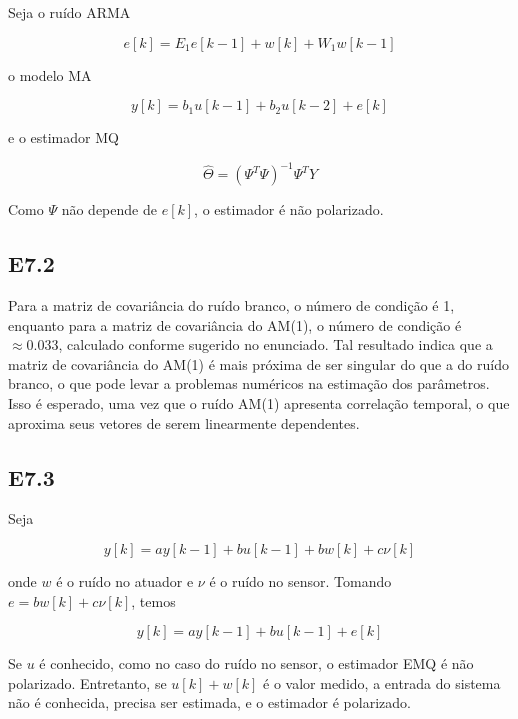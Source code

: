\documentclass{article}
\begin{document}
Seja o ruído ARMA

\begin{equation}
    e[k] = E_1 e[k-1] + w[k] + W_1 w[k-1]
\end{equation}

o modelo MA

\begin{equation}
    y[k] = b_1 u[k-1] + b_2 u[k-2] + e[k]
\end{equation}

e o estimador MQ

\begin{equation}
    \hat{\Theta} = ( \Psi^T \Psi )^{-1} \Psi^T Y
\end{equation}

Como $\Psi$ não depende de $e[k]$, o estimador é não polarizado.

\subsection*{E7.2}

Para a matriz de covariância do ruído branco, o número de condição é 1, enquanto para a matriz de covariância do AM(1), o número de condição é $\approx 0.033$, calculado conforme sugerido no enunciado. Tal resultado indica que a matriz de covariância do AM(1) é mais próxima de ser singular do que a do ruído branco, o que pode levar a problemas numéricos na estimação dos parâmetros. Isso é esperado, uma vez que o ruído AM(1) apresenta correlação temporal, o que aproxima seus vetores de serem linearmente dependentes.

\subsection*{E7.3}

Seja

\begin{equation}
    y[k] = ay[k-1] + bu[k-1] + bw[k] + c\nu[k]
\end{equation}

onde $w$ é o ruído no atuador e $\nu$ é o ruído no sensor. Tomando $e = bw[k] + c\nu[k]$, temos

\begin{equation}
    y[k] = ay[k-1] + bu[k-1] + e[k]
\end{equation}

Se $u$ é conhecido, como no caso do ruído no sensor, o estimador EMQ é não polarizado. Entretanto, se $u[k] + w[k]$ é o valor medido, a entrada do sistema não é conhecida, precisa ser estimada, e o estimador é polarizado.
\end{document}
